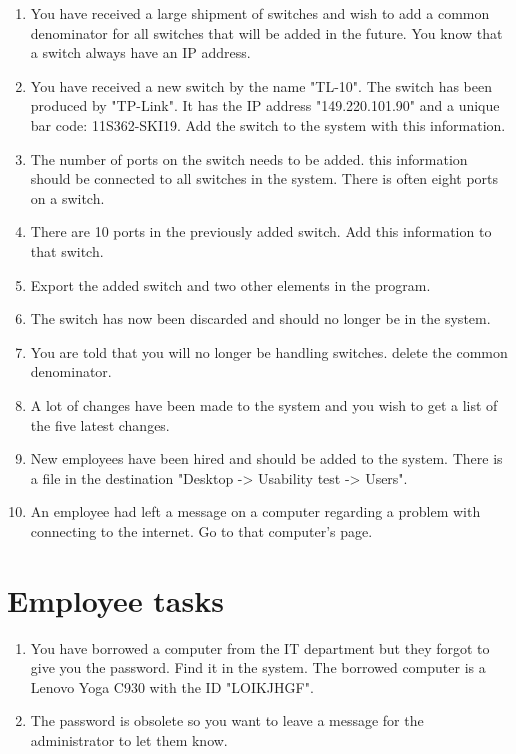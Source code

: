 \begin{enumerate}
    \item You have received a large shipment of switches and wish to add a common denominator for all switches that will be added in the future. You know that a switch always have an IP address. 
    \item You have received a new switch by the name "TL-10". The switch has been produced by "TP-Link". It has the IP address "149.220.101.90" and a unique bar code: 11S362-SKI19. Add the switch to the system with this information. 
    \item The number of ports on the switch needs to be added. this information should be connected to all switches in the system. There is often eight ports on a switch. 
    \item There are 10 ports in the previously added switch. Add this information to that switch. 
    \item Export the added switch and two other elements in the program. 
    \item The switch has now been discarded and should no longer be in the system. 
    \item You are told that you will no longer be handling switches. delete the common denominator. 
    \item A lot of changes have been made to the system and you wish to get a list of the five latest changes. 
    \item New employees have been hired and should be added to the system. There is a file in the destination "Desktop -> Usability test -> Users".
    \item An employee had left a message on a computer regarding a problem with connecting to the internet. Go to that computer's page. 
\end{enumerate}


\section*{Employee tasks}

\begin{enumerate}
    \item You have borrowed a computer from the IT department but they forgot to give you the password. Find it in the system. The borrowed computer is a  Lenovo Yoga C930 with the ID "LOIKJHGF".
    \item The password is obsolete so you want to leave a message for the administrator to let them know. 
\end{enumerate}


